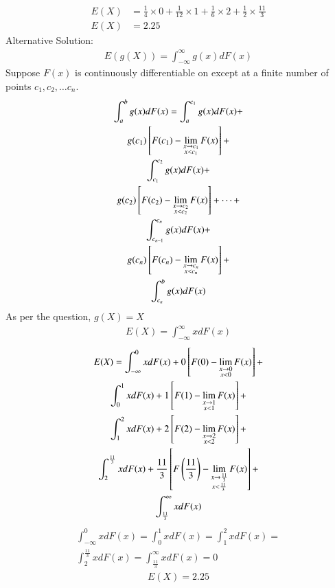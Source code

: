 \begin{align}
    E(X) &= {\frac{1}{4}}\times 0 + {\frac{1}{12}}\times 1 + {\frac{1}{6}}\times 2 + {\frac{1}{2}}\times{\frac{11}{3}}\\
    E(X) &= 2.25
\end{align}
%
{Alternative Solution: }
\begin{align}
    E(g(X)) = \int_{-\infty}^{\infty} g(x)dF(x)
\end{align}
Suppose $F(x)$ is continuously differentiable on  except at a finite number of points $c_1, c_2, \dots c_n$.\\
\begin{multline}
    \int_{a}^{b}g(x)dF(x) = \int_{a}^{c_1}g(x)dF(x) +\\ g(c_1){}\left[F(c_1) - \lim_{\substack{x \to c_1 \\ x < c_1}}F(x)\right] + \\ \int_{c_1}^{c_2}g(x)dF(x) + \\g(c_2){}\left[F(c_2) - \lim_{\substack{x \to c_2 \\ x < c_2}}F(x)\right] + \dots +\\ \int_{c_{n-1}}^{c_n}g(x)dF(x) +\\ g(c_n){}\left[F(c_n) - \lim_{\substack{x \to c_n \\ x < c_n}}F(x)\right] + \\ \int_{c_n}^{b}g(x)dF(x)
\end{multline}
As per the question, $g(X) = X$
\begin{align}
    E(X) = \int_{-\infty}^{\infty} xdF(x)
\end{align}
\begin{multline}
    E(X) = \int_{-\infty}^{0}xdF(x) + 0{}\left[F(0) - \lim_{\substack{x \to 0 \\ x < 0}}F(x)\right] + \\ \int_{0}^{1}xdF(x) + 1{}\left[F(1) - \lim_{\substack{x \to 1 \\ x < 1}}F(x)\right] + \\ \int_{1}^{2}xdF(x) + 2{}\left[F(2) - \lim_{\substack{x \to 2 \\ x < 2}}F(x)\right] + \\ \int_{2}^{\frac{11}{3}}xdF(x) +  \frac{11}{3}{}\left[F\left(\frac{11}{3}\right) - \lim_{\substack{x \to \frac{11}{3} \\ x < \frac{11}{3}}}F(x)\right] +\\ \int_{\frac{11}{3}}^{\infty}xdF(x)
\end{multline}
\begin{multline}
    \int_{-\infty}^{0}xdF(x) = \int_{0}^{1}xdF(x) = \int_{1}^{2}xdF(x) = \\ \int_{2}^{\frac{11}{3}}xdF(x) = \int_{\frac{11}{3}}^{\infty}xdF(x) = 0
\end{multline}
\begin{align}
    E(X) = 2.25
\end{align}